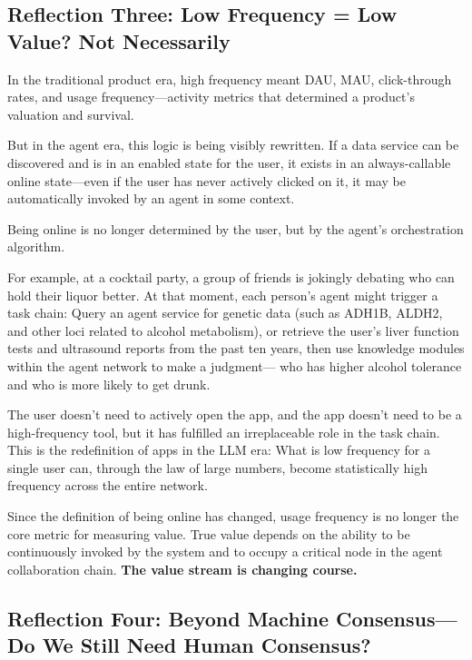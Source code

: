 \subsection{Reflection Three: Low Frequency = Low Value? Not Necessarily}

In the traditional product era, high frequency meant DAU, MAU, click-through rates, and usage frequency---activity metrics that determined a product's valuation and survival.

But in the agent era, this logic is being visibly rewritten. If a data service can be discovered and is in an enabled state for the user, it exists in an always-callable online state---even if the user has never actively clicked on it, it may be automatically invoked by an agent in some context.

\begin{myquote}
Being online is no longer determined by the user, but by the agent's orchestration algorithm.
\end{myquote}

For example, at a cocktail party, a group of friends is jokingly debating who can hold their liquor better. At that moment, each person's agent might trigger a task chain:
{\kaiti
Query an agent service for genetic data (such as ADH1B, ALDH2, and other loci related to alcohol metabolism),
or retrieve the user's liver function tests and ultrasound reports from the past ten years,
then use knowledge modules within the agent network to make a judgment---
who has higher alcohol tolerance and who is more likely to get drunk.
}

\vspace{1em}

The user doesn't need to actively open the app, and the app doesn't need to be a high-frequency tool, but it has fulfilled an irreplaceable role in the task chain.
This is the redefinition of apps in the LLM era:
What is low frequency for a single user can, through the law of large numbers, become statistically high frequency across the entire network.

\vspace{1em}

Since the definition of being online has changed, usage frequency is no longer the core metric for measuring value.
True value depends on the ability to be continuously invoked by the system and to occupy a critical node in the agent collaboration chain.
\textbf{The value stream is changing course.}

\newpage
\subsection{Reflection Four: Beyond Machine Consensus---Do We Still Need Human Consensus?}

